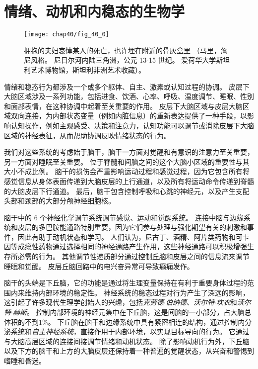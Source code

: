 \part{情绪、动机和内稳态的生物学}

\begin{figure}[htbp]
	\centering
	\texttt{[image: chap40/fig\_40\_0]}
	\caption{拥抱的夫妇哀悼某人的死亡，也许埋在附近的骨灰盒里
		（马里，詹尼风格。
		尼日尔河内陆三角洲，公元 13-15 世纪。
		爱荷华大学斯坦利艺术博物馆，斯坦利非洲艺术收藏）。}
	\label{fig:40_0}
\end{figure}


情绪和稳态行为都涉及一个或多个躯体、自主、激素或认知过程的协调。
皮层下大脑区域涉及一系列功能，包括进食、饮酒、心率、呼吸、温度调节、睡眠、性别和面部表情，在这种协调中起着至关重要的作用。
皮层下大脑区域与皮层大脑区域双向连接，为内部状态变量（例如内脏信息）的重新表达提供了一种手段，以影响认知操作，例如主观感受、决策和注意力，认知功能可以调节或消除皮层下大脑区域的神经表征，从而帮助协调反映情绪状态的行为。



我们对这些系统的考虑始于脑干，脑干一方面对觉醒和有意识的注意力至关重要，另一方面对睡眠至关重要。
位于脊髓和间脑之间的这个大脑小区域的重要性与其大小不成比例。
脑干的损伤会严重影响运动过程和感觉过程，因为它包含所有将感觉信息从身体表面传递到大脑皮层的上行通道，以及所有将运动命令传递到脊髓的大脑皮层下行通道。
最后，脑干包含控制呼吸和心跳的神经元，以及产生支配头部和颈部的大部分颅神经细胞核。


脑干中的 6 个神经化学调节系统调节感觉、运动和觉醒系统。
连接中脑与边缘系统和皮层的多巴胺能通路特别重要，因为它们参与处理与强化期望有关的刺激和事件，因此有助于动机状态和学习。
人们认为，尼古丁、酒精、阿片类药物和可卡因等成瘾性药物通过选择相同的神经通路产生作用，这些神经通路可以积极增强生存所必需的行为。
其他调节性递质部分通过控制丘脑和皮层之间的信息流来调节睡眠和觉醒。
皮层丘脑回路中的电兴奋异常可导致癫痫发作。


脑干的头端是下丘脑，它的功能是通过将生理变量保持在有利于重要身体过程的范围内来维持内部环境的稳定性。
神经系统的稳态过程对行为产生了深远的影响，这引起了许多现代生理学创始人的兴趣，包括\textit{克劳德$\cdot$伯纳德}、\textit{沃尔特$\cdot$坎农}和\textit{沃尔特$\cdot$赫斯}。
控制内部环境的神经元集中在下丘脑，这是间脑的一小部分，占大脑总体积的不到1\%。
下丘脑在脑干和边缘系统中具有紧密相连的结构，通过控制内分泌系统和\textit{自主神经系统}，直接作用于内部环境，以实现目标导向的行为。
它通过与大脑高层区域的连接间接调节情绪和动机状态。
除了影响动机行为外，下丘脑以及下方的脑干和上方的大脑皮层还保持着一种普遍的觉醒状态，从兴奋和警惕到嗜睡和昏迷。


